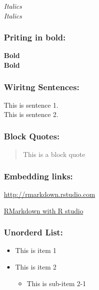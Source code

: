 \documentclass[]{article}
\providecommand{\tightlist}{%
  \setlength{\itemsep}{0pt}\setlength{\parskip}{0pt}}
\begin{document}
\emph{Italics}\\
\emph{Italics}

\hypertarget{priting-in-bold}{%
\subsubsection{Priting in bold:}\label{priting-in-bold}}

\textbf{Bold}\\
\textbf{Bold}

\hypertarget{wiritng-sentences}{%
\subsubsection{Wiritng Sentences:}\label{wiritng-sentences}}

This is sentence 1.\\
This is sentence 2.

\hypertarget{block-quotes}{%
\subsubsection{Block Quotes:}\label{block-quotes}}

\begin{quote}
This is a block quote
\end{quote}

\hypertarget{embedding-links}{%
\subsubsection{Embedding links:}\label{embedding-links}}

\url{http://rmarkdown.rstudio.com}

\href{\%5Bhttp://rmarkdown.rstudio.com\%5D}{RMarkdown with R studio}

\hypertarget{unorderd-list}{%
\subsubsection{Unorderd List:}\label{unorderd-list}}

\begin{itemize}
\tightlist
\item
  This is item 1
\item
  This is item 2

  \begin{itemize}
  \tightlist
  \item
    This is sub-item 2-1
  \end{itemize}
\end{itemize}
\end{document}
